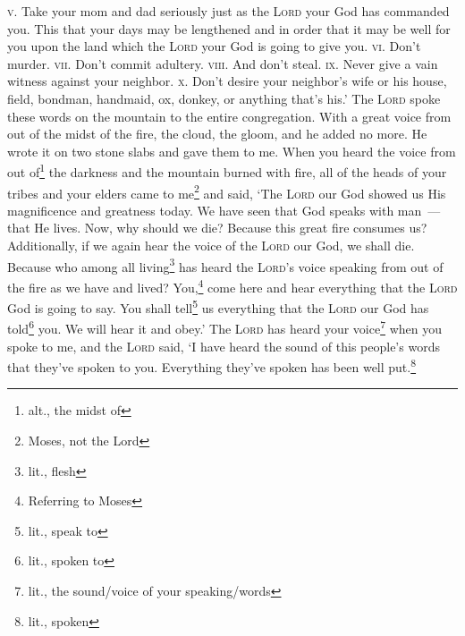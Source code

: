 \begin{enumerate*}[mode=unboxed]
     \textsc{v.} Take your mom and dad seriously just as the \textsc{Lord} your God has commanded you. This that your days may be lengthened and in order that it may be well for you upon the land which the \textsc{Lord} your God is going to give you.%
     \textsc{vi.} Don't murder.%
     \textsc{vii.} Don't commit adultery.%
     \textsc{viii.} And don't steal.%
     \textsc{ix.} Never give a vain witness against your neighbor.%
     \textsc{x.} Don't desire your neighbor's wife or his house, field, bondman, handmaid, ox, donkey, or anything that's his.'%
     The \textsc{Lord} spoke these words on the mountain to the entire congregation. With a great voice from out of the midst of the fire, the cloud, the gloom, and he added no more. He wrote it on two stone slabs and gave them to me.%
     When you heard the voice from out of\footnote{alt., the midst of} the darkness and the mountain burned with fire, all of the heads of your tribes and your elders came to me\footnote{Moses, not the Lord}%
     and said, `The \textsc{Lord} our God showed us His magnificence and greatness today. We have seen that God speaks with man~--- that He lives.%
     Now, why should we die? Because this great fire consumes us? Additionally, if we again hear the voice of the \textsc{Lord} our God, we shall die.%
     Because who among all living\footnote{lit., flesh} has heard the \textsc{Lord}'s voice speaking from out of the fire as we have and lived?%
     You,\footnote{Referring to Moses} come here and hear everything that the \textsc{Lord} God is going to say. You shall tell\footnote{lit., speak to} us everything that the \textsc{Lord} our God has told\footnote{lit., spoken to} you. We will hear it and obey.'%
     The \textsc{Lord} has heard your voice\footnote{lit., the sound/voice of your speaking/words} when you spoke to me, and the \textsc{Lord} said, `I have heard the sound of this people's words that they've spoken to you. Everything they've spoken has been well put.\footnote{lit., spoken}%
\end{enumerate*}
